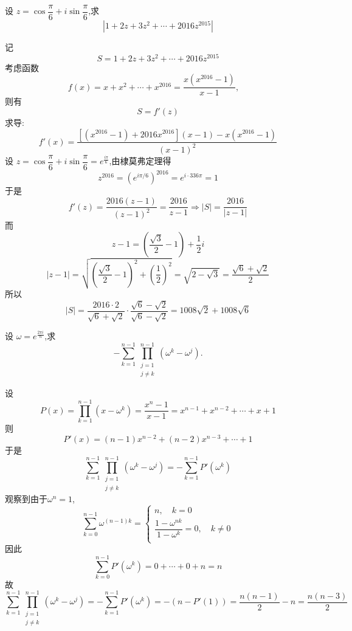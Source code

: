 \begin{questions}
    \question 设 \(z=\cos\dfrac{\pi}{6}+i\sin\dfrac{\pi}{6}\),求
    \[
    \left|1+2z+3z^2+\cdots+2016z^{2015}\right|
    \]
    \begin{solution}
        记
        \[
        S = 1 + 2z + 3z^2 + \cdots + 2016z^{2015} 
        \]
        考虑函数
        \[
        f(x) = x + x^2 + \cdots + x^{2016} = \frac{x(x^{2016} - 1)}{x - 1},\quad 
        \]
        则有$$S = f'(z)$$
        求导:
        \[
        f'(x) = \frac{[(x^{2016} - 1) + 2016x^{2016}](x - 1) - x(x^{2016} - 1)}{(x - 1)^2}
        \]
        设 \(z = \cos\dfrac{\pi}{6} + i\sin\dfrac{\pi}{6} = e^{\frac{i\pi}{6}}\),由棣莫弗定理得
        \[
        z^{2016} = \left(e^{i\pi/6}\right)^{2016} = e^{i\cdot336\pi} = 1
        \]
        于是
        \[
        f'(z) = \frac{2016(z - 1)}{(z - 1)^2} = \frac{2016}{z - 1}
        \Rightarrow |S| = \frac{2016}{|z - 1|}
        \]
        而
        \[
        z - 1 = \left(\frac{\sqrt{3}}{2} - 1\right) + \frac{1}{2}i
        \]
        \[
        |z - 1| = \sqrt{\left(\frac{\sqrt{3}}{2} - 1\right)^2 + \left(\frac{1}{2}\right)^2} = \sqrt{2 - \sqrt{3}} = \frac{\sqrt6+\sqrt2}{2}
        \]
        所以
        \[
        |S| = \frac{2016\cdot2}{\sqrt6+\sqrt2}\cdot \frac{\sqrt6-\sqrt2}{\sqrt6-\sqrt2} = 1008\sqrt{2} + 1008\sqrt{6}
        \]
    \end{solution}

    \question 设 $\omega = e^{\frac{2\pi i}{n}}$,求
    \[ 
    -\sum_{k=1}^{n-1} \prod_{\substack{j=1 \\ j \neq k}}^{n-1} (\omega^k - \omega^j). 
    \]
    \begin{solution}
        设
        \[
        P(x)=\prod_{k=1}^{n-1}(x-\omega^k)=\frac{x^n-1}{x-1}=x^{n-1}+x^{n-2}+\cdots +x+1
        \]
        则
        \[
        P'(x)=(n-1)x^{n-2}+(n-2)x^{n-3}+\cdots + 1
        \]
        于是
        \[
        \sum_{k=1}^{n-1} \prod_{\substack{j=1 \\ j \neq k}}^{n-1} (\omega^k - \omega^j)=-\sum_{k=1}^{n-1} P'(\omega^k)
        \]
        观察到由于$\omega^n=1$,
        \[
        \sum_{k=0}^{n-1} \omega^{(n-1)k}
        =\begin{cases}
        n, \quad k=0 \\[2pt]
        \dfrac{1-\omega^{nk}}{1-\omega^k}=0,\quad k \neq 0 \\
        \end{cases}
        \]
        因此
        \[
        \sum_{k=0}^{n-1} P'(\omega^k)=0+\cdots+0+n=n
        \]
        故
        \[
        \sum_{k=1}^{n-1} \prod_{\substack{j=1 \\ j \neq k}}^{n-1} (\omega^k - \omega^j)=-\sum_{k=1}^{n-1} P'(\omega^k)=-(n-P'(1))=\frac{n(n-1)}{2}-n=\frac{n(n-3)}{2}
        \]
    \end{solution}


\end{questions}
